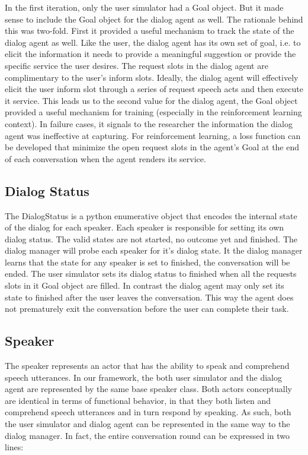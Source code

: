 In the first iteration, only the user simulator had a Goal object. But it made sense to include the Goal object for the dialog agent as well. The rationale behind this was two-fold. First it provided a useful mechanism to track the state of the dialog agent as well. Like the user, the dialog agent has its own set of goal, i.e. to elicit the information it needs to provide a meaningful suggestion or provide the specific service the user desires. The request slots in the dialog agent are complimentary to the user's inform slots. Ideally, the dialog agent will effectively elicit the user inform slot through a series of request speech acts and then execute it service. This leads us to the second value for the dialog agent, the Goal object provided a useful mechanism for training (especially in the reinforcement learning context). In failure cases, it signals to the researcher the information the dialog agent was ineffective at capturing. For reinforcement learning, a loss function can be developed that minimize the open request slots in the agent's Goal at the end of each conversation when the agent renders its service. 

\subsection{Dialog Status}

The DialogStatus is a python enumerative object that encodes the internal state of the dialog for each speaker. Each speaker is responsible for setting its own dialog status. The valid states are not started, no outcome yet and finished. The dialog manager will probe each speaker for it's dialog state. It the dialog manager learns that the state for any speaker is set to finished, the conversation will be ended. The user simulator sets its dialog status to finished when all the requests slots in it Goal object are filled. In contrast the dialog agent may only set its state to finished after the user leaves the conversation. This way the agent does not prematurely exit the conversation before the user can complete their task. 

\subsection{Speaker}

The speaker represents an actor that has the ability to speak and comprehend speech utterances. In our framework, the both user simulator and the dialog agent are represented by the same base speaker class. Both actors conceptually are identical in terms of functional behavior, in that they both listen and comprehend speech utterances and in turn respond by speaking. As such, both the user simulator and dialog agent can be represented in the same way to the dialog manager. In fact, the entire conversation round can be expressed in two lines: 


